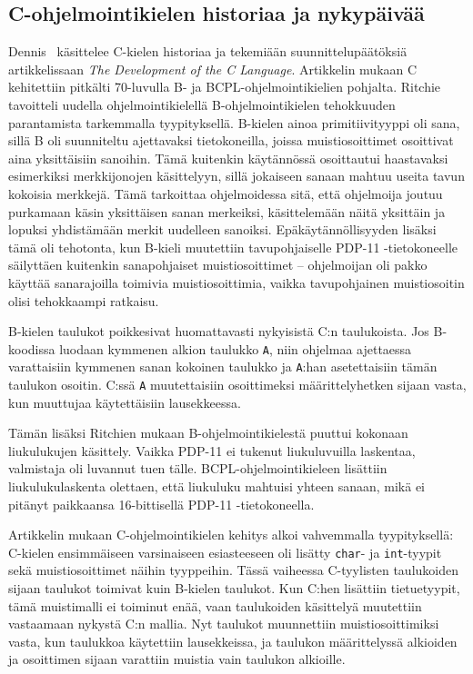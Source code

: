 \subsection{C-ohjelmointikielen historiaa ja nykypäivää}
\label{sec:ctaustaa}

Dennis~\citet{chistory} käsittelee C-kielen historiaa ja tekemiään
suunnittelupäätöksiä artikkelissaan \emph{The Development of the C Language}.
Artikkelin mukaan C kehitettiin pitkälti 70-luvulla B- ja
BCPL-ohjelmointikielien pohjalta. Ritchie tavoitteli uudella
ohjelmointikielellä B-ohjelmointikielen tehokkuuden parantamista tarkemmalla
tyypityksellä. B-kielen ainoa primitiivityyppi oli sana, sillä B oli suunniteltu ajettavaksi
tietokoneilla, joissa muistiosoittimet osoittivat aina yksittäisiin sanoihin.
Tämä kuitenkin käytännössä osoittautui haastavaksi esimerkiksi merkkijonojen
käsittelyyn, sillä jokaiseen sanaan mahtuu useita tavun kokoisia merkkejä. Tämä
tarkoittaa ohjelmoidessa sitä, että ohjelmoija joutuu purkamaan käsin
yksittäisen sanan merkeiksi, käsittelemään näitä yksittäin ja lopuksi
yhdistämään merkit uudelleen sanoiksi. Epäkäytännöllisyyden lisäksi tämä oli
tehotonta, kun B-kieli muutettiin tavupohjaiselle PDP-11 -tietokoneelle
säilyttäen kuitenkin sanapohjaiset muistiosoittimet -- ohjelmoijan oli pakko
käyttää sanarajoilla toimivia muistiosoittimia, vaikka tavupohjainen
muistiosoitin olisi tehokkaampi ratkaisu.

B-kielen taulukot poikkesivat huomattavasti nykyisistä C:n taulukoista. Jos
B\hyp{}koodissa luodaan kymmenen alkion taulukko \texttt{A}, niin ohjelmaa
ajettaessa varattaisiin kymmenen sanan kokoinen taulukko ja \texttt{A}:han
asetettaisiin tämän taulukon osoitin. C:ssä \texttt{A} muutettaisiin
osoittimeksi määrittelyhetken sijaan vasta, kun muuttujaa käytettäisiin
lausekkeessa.

Tämän lisäksi Ritchien mukaan B-ohjelmointikielestä puuttui kokonaan
liukulukujen käsittely. Vaikka PDP-11 ei tukenut liukuluvuilla laskentaa,
valmistaja oli luvannut tuen tälle. BCPL-ohjelmointikieleen lisättiin
liukulukulaskenta olettaen, että liukuluku mahtuisi yhteen sanaan, mikä ei
pitänyt paikkaansa 16-bittisellä PDP-11 -tietokoneella.

Artikkelin mukaan C-ohjelmointikielen kehitys alkoi vahvemmalla tyypityksellä:
C-kielen ensimmäiseen varsinaiseen esiasteeseen oli lisätty \texttt{char}- ja
\texttt{int}-tyypit sekä muistiosoittimet näihin tyyppeihin. Tässä vaiheessa
C-tyylisten taulukoiden sijaan taulukot toimivat kuin B-kielen taulukot. Kun
C:hen lisättiin tietuetyypit, tämä muistimalli ei toiminut enää, vaan
taulukoiden käsittelyä muutettiin vastaamaan nykystä C:n mallia. Nyt taulukot
muunnettiin muistiosoittimiksi vasta, kun taulukkoa käytettiin lausekkeissa, ja
taulukon määrittelyssä alkioiden ja osoittimen sijaan varattiin muistia vain
taulukon alkioille.

